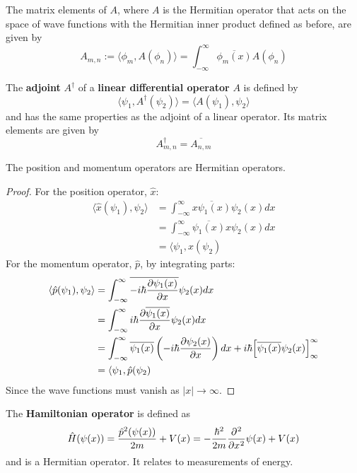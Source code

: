 \begin{definition}
	The matrix elements of $A$, where $A$ is the Hermitian operator that acts on the space of wave functions with the Hermitian inner product defined as before, are given by
	\[
		A_{m, n} := \langle \phi_m, A (\phi_n) \rangle = \int_{-\infty}^{\infty} \overline{\phi_m(x)} A (\phi_n)
	\]
\end{definition}

\begin{definition}
	The \textbf{adjoint} $A^{\dagger}$ of a \textbf{linear differential operator} $A$ is defined by
	\[
		\langle \psi_1, A^{\dagger} (\psi_2) \rangle = \langle A(\psi_1), \psi_2 \rangle
	\]
	and has the same properties as the adjoint of a linear operator. Its matrix elements are given by
	\[
		A^{\dagger}_{m, n} = \overline{A_{n, m}}
	\]
\end{definition}

\begin{theorem}
	The position and momentum operators are Hermitian operators.
\end{theorem}

\begin{proof}
	For the position operator, $\hat{x}$:
	\[
		\begin{aligned}
			\langle \hat{x}(\psi_1), \psi_2 \rangle
				& = \int_{-\infty}^{\infty} \overline{x \psi_1(x)} \psi_2(x) dx \\
				& = \int_{-\infty}^{\infty} \overline{\psi_1(x)} x \psi_2(x) dx \\
				& = \langle \psi_1, \hat{x}(\psi_2)
		\end{aligned}
	\]
	For the momentum operator, $\hat{p}$, by integrating parts:
	\[
		\begin{aligned}
			\langle \hat{p}(\psi_1), \psi_2 \rangle
				& = \int_{-\infty}^{\infty} \overline{-i \hbar \diffp{\psi_1(x)}{x}} \psi_2(x) dx \\
				& = \int_{-\infty}^{\infty} i \hbar \diffp{\overline{\psi_1(x)}}{x} \psi_2(x) dx \\
				& = \int_{-\infty}^{\infty} \overline{\psi_1(x)} \left( -i \hbar \diffp{\psi_2(x)}{x} \right) dx + i \hbar {\left[ \overline{\psi_1(x)} \psi_2(x) \right]}_{\infty}^{\infty} \\
				& = \langle \psi_1, \hat{p}(\psi_2)
		\end{aligned}
	\]
	Since the wave functions must vanish as $|x| \rightarrow \infty$.
\end{proof}

\begin{definition}
	The \textbf{Hamiltonian operator} is defined as
	\[
		\hat{H}(\psi(x)) = \frac{\hat{p}^2 (\psi(x))}{2m} + V(x) = -\frac{\hbar^2}{2m} \diffp[2]{}{x} \psi(x) + V(x)
	\]
	and is a Hermitian operator. It relates to measurements of energy.
\end{definition}

